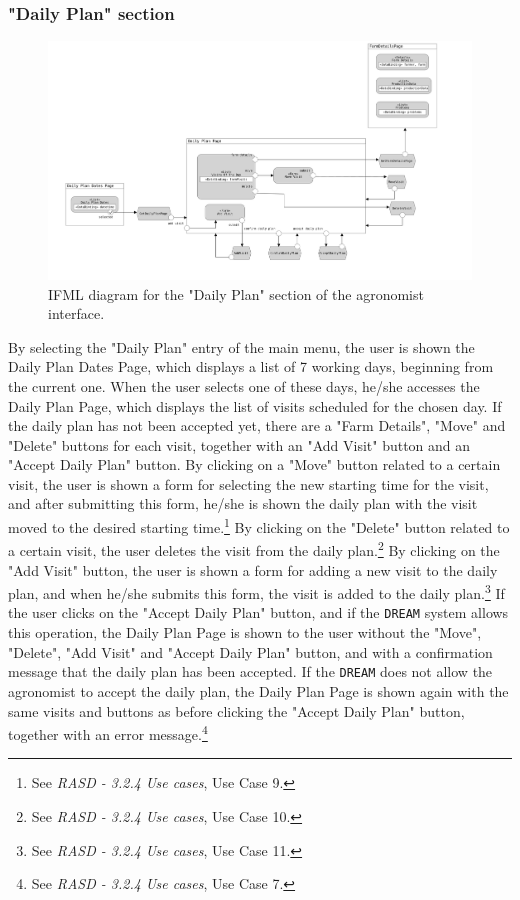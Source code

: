 \documentclass{article}
\begin{document}
\subsubsection{"Daily Plan" section}
\begin{figure}[H]
    \centering
     \includegraphics[scale=0.1]{diagrams/ui diagrams/agronomist/daily plan.png} 
    \caption{IFML diagram for the "Daily Plan" section of the agronomist interface.}
\end{figure}
By selecting the "Daily Plan" entry of the main menu, the user is shown the Daily Plan Dates Page, which displays a list of 7 working days, beginning from the current one.\newline
When the user selects one of these days, he/she accesses the Daily Plan Page, which displays the list of visits scheduled for the chosen day. \newline
If the daily plan has not been accepted yet, there are a "Farm Details", "Move" and "Delete" buttons for each visit, together with an "Add Visit" button and an "Accept Daily Plan" button. By clicking on a "Move" button related to a certain visit, the user is shown a form for selecting the new starting time for the visit, and after submitting this form, he/she is shown the daily plan with the visit moved to the desired starting time.\footnote{See \textit{RASD - 3.2.4 Use cases}, Use Case 9.} By clicking on the "Delete" button related to a certain visit, the user deletes the visit from the daily plan.\footnote{See \textit{RASD - 3.2.4 Use cases}, Use Case 10.} By clicking on the "Add Visit" button, the user is shown a form for adding a new visit to the daily plan, and when he/she submits this form, the visit is added to the daily plan.\footnote{See \textit{RASD - 3.2.4 Use cases}, Use Case 11.} If the user clicks on the "Accept Daily Plan" button, and if the \verb|DREAM| system allows this operation, the Daily Plan Page is shown to the user without the "Move", "Delete", "Add Visit" and "Accept Daily Plan" button, and with a confirmation message that the daily plan has been accepted. If the \verb|DREAM| does not allow the agronomist to accept the daily plan, the Daily Plan Page is shown again with the same visits and buttons as before clicking the "Accept Daily Plan" button, together with an error message.\footnote{See \textit{RASD - 3.2.4 Use cases}, Use Case 7.}\newline
\end{document}
